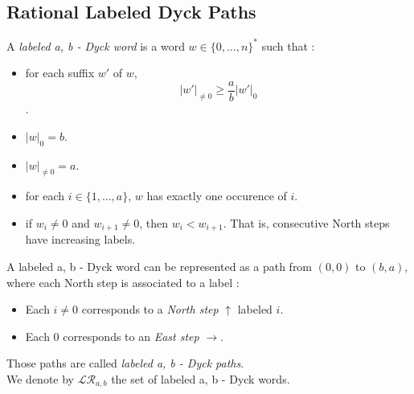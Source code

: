 \subsection{Rational Labeled Dyck Paths}

\begin{definition}
    A \emph{labeled a, b - Dyck word} is a word $w \in 
    \{0, \ldots, n\}^*$ such that :
    \begin{itemize}
        \item for each suffix $w'$ of $w$,
            $$|w'|_{\neq 0} \geqslant \frac{a}{b}|w'|_0$$.
        \item $|w|_0 = b$.
        \item $|w|_{\neq 0} = a$.
        \item for each $i \in \{1, \ldots, a\}$, $w$ has 
            exactly one occurence of $i$.
        \item if $w_i \neq 0$ and $w_{i+1} \neq 0$,
            then $w_i < w_{i+1}$. That is, consecutive
            North steps have increasing labels.
    \end{itemize}
    A labeled a, b - Dyck word can be represented
    as a path from $(0,0)$ to $(b,a)$, where each North
    step is associated to a label :
    \begin{itemize}
        \item Each $i \neq 0$ corresponds to a
            \emph{North step} $\uparrow$ labeled $i$.
        \item Each $0$ corresponds to an
            \emph{East step} $\rightarrow$.
    \end{itemize}
    Those paths are called \emph{labeled a, b - Dyck paths}.\\
    We denote by $\mathcal{LR}_{a,b}$ the set of labeled
    a, b - Dyck words.
\end{definition}

